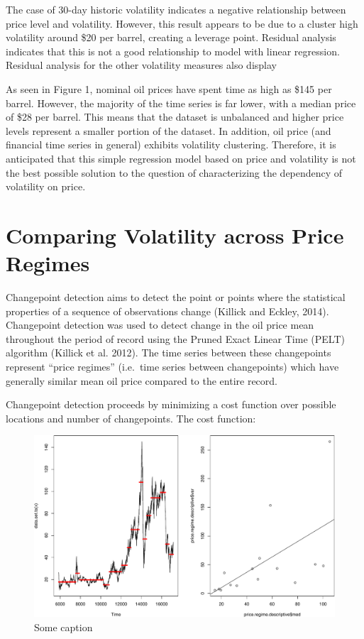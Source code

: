 \documentclass[11pt,]{article}
\begin{document}
The case of 30-day historic volatility indicates a negative relationship
between price level and volatility. However, this result appears to be
due to a cluster high volatility around \$20 per barrel, creating a
leverage point. Residual analysis indicates that this is not a good
relationship to model with linear regression. Residual analysis for the
other volatility measures also display

As seen in Figure 1, nominal oil prices have spent time as high as \$145
per barrel. However, the majority of the time series is far lower, with
a median price of \$28 per barrel. This means that the dataset is
unbalanced and higher price levels represent a smaller portion of the
dataset. In addition, oil price (and financial time series in general)
exhibits volatility clustering. Therefore, it is anticipated that this
simple regression model based on price and volatility is not the best
possible solution to the question of characterizing the dependency of
volatility on price.

\section{Comparing Volatility across Price
Regimes}\label{comparing-volatility-across-price-regimes}

Changepoint detection aims to detect the point or points where the
statistical properties of a sequence of observations change (Killick and
Eckley, 2014). Changepoint detection was used to detect change in the
oil price mean throughout the period of record using the Pruned Exact
Linear Time (PELT) algorithm (Killick et al. 2012). The time series
between these changepoints represent ``price regimes'' (i.e.~time series
between changepoints) which have generally similar mean oil price
compared to the entire record.

Changepoint detection proceeds by minimizing a cost function over
possible locations and number of changepoints. The cost function:

\begin{figure}[htbp]
\centering
\includegraphics{Figs/unnamed-chunk-12-1.pdf}
\caption{Some caption}
\end{figure}
\end{document}
